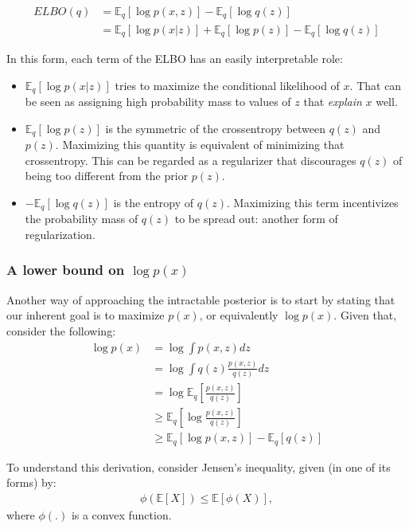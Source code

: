 \begin{align}
    ELBO(q) &= \mathbb{E}_q [\log p(x, z)] - \mathbb{E}_q [\log q(z)] \\
            &= \mathbb{E}_q [\log p(x|z)] + \mathbb{E}_q [\log p(z)] - \mathbb{E}_q [\log q(z)]
\end{align}

In this form, each term of the ELBO has an easily interpretable role:
\begin{itemize}
    \item $\mathbb{E}_q [\log p(x|z)]$ tries to maximize the conditional likelihood of $x$. That
        can be seen as assigning high probability mass to values of $z$ that \emph{explain} $x$
        well.
    \item $\mathbb{E}_q [\log p(z)]$ is the symmetric of the crossentropy between
        $q(z)$ and $p(z)$. Maximizing this quantity is equivalent of minimizing
        that crossentropy. This can be regarded as a regularizer that discourages
        $q(z)$ of being too different from the prior $p(z)$.
    \item $ - \mathbb{E}_q [\log q(z)]$ is the entropy of $q(z)$. Maximizing
        this term incentivizes the probability mass of $q(z)$ to be spread out:
        another form of regularization.
\end{itemize}

\subsubsection{A lower bound on $\log p(x)$}
\label{subsubsection:elbo}

Another way of approaching the intractable posterior is to start by stating
that our inherent goal is to maximize $p(x)$, or equivalently $\log p(x)$. Given
that, consider the following:
\begin{align}
    \log p(x) &= \log \int p(x, z) dz\\
    &= \log \int q(z) \frac{p(x, z)}{q(z)} dz \\
    &= \log \mathbb{E}_q[\frac{p(x, z)}{q(z)}] \label{eq:elbojensen1} \\
    &\geq \mathbb{E}_q[\log \frac{p(x, z)}{q(z)}] \label{eq:elbojensen2} \\
    &\geq \mathbb{E}_q[\log p(x, z)] - \mathbb{E}_q[q(z)] \label{eq:elbojensen3}
\end{align}

To understand this derivation, consider Jensen's inequality, given (in one of
its forms) by:
\begin{align}
    \phi(\mathbb{E}[X]) \leq \mathbb{E}[\phi(X)], \label{eq:jensen}
\end{align} where $\phi(.)$ is a convex function.

